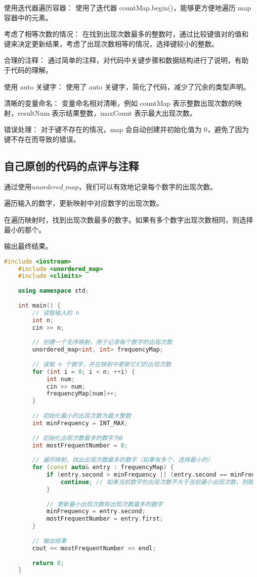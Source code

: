 使用迭代器遍历容器： 使用了迭代器 countMap.begin()，能够更方便地遍历 map 容器中的元素。

考虑了相等次数的情况： 在找到出现次数最多的整数时，通过比较键值对的值和键来决定更新结果，考虑了出现次数相等的情况，选择键较小的整数。

合理的注释： 通过简单的注释，对代码中关键步骤和数据结构进行了说明，有助于代码的理解。

使用 auto 关键字： 使用了 auto 关键字，简化了代码，减少了冗余的类型声明。

清晰的变量命名： 变量命名相对清晰，例如 countMap 表示整数出现次数的映射，resultNum 表示结果整数，maxCount 表示最大出现次数。

错误处理： 对于键不存在的情况，map 会自动创建并初始化值为 0，避免了因为键不存在而导致的错误。

\subsection{自己原创的代码的点评与注释}

通过使用$unordered\_map$，我们可以有效地记录每个数字的出现次数。

遍历输入的数字，更新映射中对应数字的出现次数。

在遍历映射时，找到出现次数最多的数字。如果有多个数字出现次数相同，则选择最小的那个。

输出最终结果。

\begin{lstlisting}[language=C++]
    #include <iostream>
    #include <unordered_map>
    #include <climits>
    
    using namespace std;
    
    int main() {
        // 读取输入的 n
        int n;
        cin >> n;
    
        // 创建一个无序映射，用于记录每个数字的出现次数
        unordered_map<int, int> frequencyMap;
    
        // 读取 n 个数字，并在映射中更新它们的出现次数
        for (int i = 0; i < n; ++i) {
            int num;
            cin >> num;
            frequencyMap[num]++;
        }
    
        // 初始化最小的出现次数为最大整数
        int minFrequency = INT_MAX;
    
        // 初始化出现次数最多的数字为0
        int mostFrequentNumber = 0;
    
        // 遍历映射，找出出现次数最多的数字（如果有多个，选择最小的）
        for (const auto& entry : frequencyMap) {
            if (entry.second > minFrequency || (entry.second == minFrequency && entry.first > mostFrequentNumber)) {
                continue; // 如果当前数字的出现次数不大于当前最小出现次数，则跳过
            }
    
            // 更新最小出现次数和出现次数最多的数字
            minFrequency = entry.second;
            mostFrequentNumber = entry.first;
        }
    
        // 输出结果
        cout << mostFrequentNumber << endl;
    
        return 0;
    }    
\end{lstlisting}
